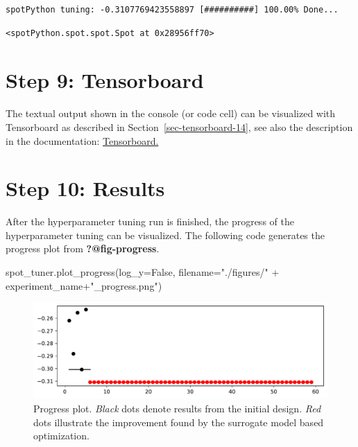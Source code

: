 \documentclass[
  letterpaper,
  DIV=11,
  numbers=noendperiod]{scrreprt}
\newenvironment{Shaded}{\begin{snugshade}}{\end{snugshade}}
\newcommand{\NormalTok}[1]{\textcolor[rgb]{0.00,0.23,0.31}{#1}}
\newcommand{\OperatorTok}[1]{\textcolor[rgb]{0.37,0.37,0.37}{#1}}
\newcommand{\StringTok}[1]{\textcolor[rgb]{0.13,0.47,0.30}{#1}}
\newcommand{\VariableTok}[1]{\textcolor[rgb]{0.07,0.07,0.07}{#1}}
\begin{document}
\begin{verbatim}
spotPython tuning: -0.3107769423558897 [##########] 100.00% Done...
\end{verbatim}

\begin{verbatim}
<spotPython.spot.spot.Spot at 0x28956ff70>
\end{verbatim}

\hypertarget{sec-tensorboard-19}{%
\section{Step 9: Tensorboard}\label{sec-tensorboard-19}}

The textual output shown in the console (or code cell) can be visualized
with Tensorboard as described in Section~\ref{sec-tensorboard-14}, see
also the description in the documentation:
\href{https://sequential-parameter-optimization.github.io/spotPython/14_spot_ray_hpt_torch_cifar10.html\#sec-tensorboard-14}{Tensorboard.}

\hypertarget{sec-results-tuning-19}{%
\section{Step 10: Results}\label{sec-results-tuning-19}}

After the hyperparameter tuning run is finished, the progress of the
hyperparameter tuning can be visualized. The following code generates
the progress plot from \textbf{?@fig-progress}.

\begin{Shaded}
\begin{Highlighting}[]
\NormalTok{spot\_tuner.plot\_progress(log\_y}\OperatorTok{=}\VariableTok{False}\NormalTok{,}
\NormalTok{    filename}\OperatorTok{=}\StringTok{"./figures/"} \OperatorTok{+}\NormalTok{ experiment\_name}\OperatorTok{+}\StringTok{"\_progress.png"}\NormalTok{)}
\end{Highlighting}
\end{Shaded}

\begin{figure}[H]

{\centering \includegraphics{19_spot_hpt_sklearn_multiclass_classification_knn_files/figure-pdf/cell-25-output-1.pdf}

}

\caption{Progress plot. \emph{Black} dots denote results from the
initial design. \emph{Red} dots illustrate the improvement found by the
surrogate model based optimization.}

\end{figure}
\end{document}
